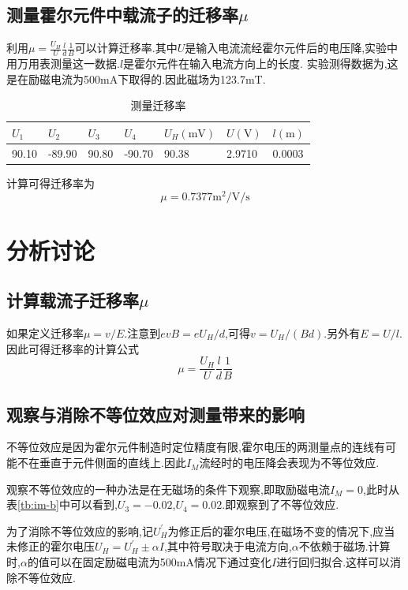 \documentclass[UTF8,a4paper]{article}%
\begin{document}
\subsection{测量霍尔元件中载流子的迁移率$\mu$}
利用$\mu=\frac{U_H}{U}\frac{l}{d}\frac{1}{B}$可以计算迁移率.其中$U$是输入电流流经霍尔元件后的电压降,实验中用万用表测量这一数据.$l$是霍尔元件在输入电流方向上的长度.
实验测得数据为,这是在励磁电流为500\unit{\mA}下取得的.因此磁场为123.7\unit{\milli\tesla}.
\begin{table}[]
    \centering
    \caption{测量迁移率}
    \begin{tabular}{llll|l|l|l}
        \hline
        $U_1$ & $U_2$  & $U_3$ & $U_4$  & $U_H(\unit{\mV})$ & $U(\unit{\V})$ & $l(\unit{\m})$ \\ \hline
        90.10 & -89.90 & 90.80 & -90.70 & 90.38             & 2.9710         & 0.0003         \\ \hline
    \end{tabular}
\end{table}
计算可得迁移率为
$$\mu=0.7377\unit{\square\metre\per\volt\per\second}$$
\section{分析讨论}
\subsection{计算载流子迁移率$\mu$}
如果定义迁移率$\mu=v/E$.注意到$evB=eU_H/d$,可得$v=U_H/(Bd)$.另外有$E=U/l$.因此可得迁移率的计算公式
$$\mu=\frac{U_H}{U}\frac{l}{d}\frac{1}{B}$$
\subsection{观察与消除不等位效应对测量带来的影响}
不等位效应是因为霍尔元件制造时定位精度有限,霍尔电压的两测量点的连线有可能不在垂直于元件侧面的直线上.因此$I_M$流经时的电压降会表现为不等位效应.

观察不等位效应的一种办法是在无磁场的条件下观察,即取励磁电流$I_M=0$,此时从表\ref{tb:im-b}中可以看到,$U_3=-0.02$,$U_4=0.02$.即观察到了不等位效应.

为了消除不等位效应的影响,记$U_H^\prime$为修正后的霍尔电压,在磁场不变的情况下,应当未修正的霍尔电压$U_H=U_H^\prime\pm\alpha I$,其中符号取决于电流方向,$\alpha$不依赖于磁场.计算时,$\alpha$的值可以在固定励磁电流为500\unit{\mA}情况下通过变化$I$进行回归拟合.这样可以消除不等位效应.
\end{document}
